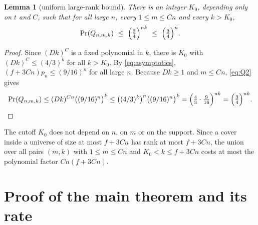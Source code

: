 \documentclass[11pt,a4paper]{article}
\theoremstyle{plain}
\newtheorem{lemma}[theorem]{Lemma}
\theoremstyle{definition}
\theoremstyle{remark}
\begin{document}
\begin{lemma}[uniform large-rank bound]\label{lem:tail}
There is an integer $K_0$, depending only on $t$ and $C$, such that for all large $n$, every $1\le m\le Cn$ and every $k>K_0$,
\begin{equation}\label{eq:tail}
\Pr(Q_{n,m,k})\ \le\ \Bigl(\tfrac34\Bigr)^{nk}\ \le\ \Bigl(\tfrac34\Bigr)^{n}.
\end{equation}
\end{lemma}

\begin{proof}
Since $(Dk)^C$ is a fixed polynomial in $k$, there is $K_0$ with $(Dk)^C\le(4/3)^k$ for all $k>K_0$. By \eqref{eq:asymptotics}, $(f+3Cn)p_n\le(9/16)^n$ for all large $n$. Because $Dk\ge1$ and $m\le Cn$, \eqref{eq:Q2} gives
\[
\Pr(Q_{n,m,k})\le(Dk)^{Cn}\bigl((9/16)^n\bigr)^k\le\bigl((4/3)^k\bigr)^n\bigl((9/16)^n\bigr)^k=\Bigl(\tfrac{4}{3}\cdot\tfrac{9}{16}\Bigr)^{nk}=\Bigl(\tfrac34\Bigr)^{nk}.\qedhere
\]
\end{proof}

The cutoff $K_0$ does not depend on $n$, on $m$ or on the support. Since a cover inside a universe of size at most $f+3Cn$ has rank at most $f+3Cn$, the union over all pairs $(m,k)$ with $1\le m\le Cn$ and $K_0<k\le f+3Cn$ costs at most the polynomial factor $Cn(f+3Cn)$.

\section{Proof of the main theorem and its rate}\label{sec:proof}
\end{document}
